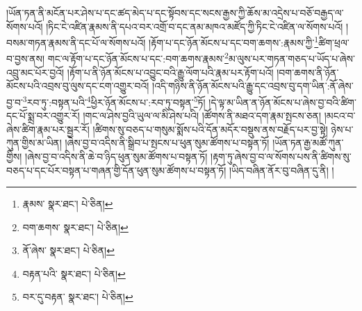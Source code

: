།ཡོན་ཏན་ནི་མངོན་པར་ཤེས་པ་དང་ཚད་མེད་པ་དང་སྟོབས་དང་སངས་རྒྱས་ཀྱི་ཆོས་མ་འདྲེས་པ་བཅོ་བརྒྱད་ལ་སོགས་པའོ། །ཏིང་ངེ་འཛིན་རྣམས་ནི་དཔའ་བར་འགྲོ་བ་དང་ནམ་མཁའ་མཛོད་ཀྱི་ཏིང་ངེ་འཛིན་ལ་སོགས་པའོ། །བསམ་གཏན་རྣམས་ནི་དང་པོ་ལ་སོགས་པའོ། །རྟོག་པ་དང་ཉོན་མོངས་པ་དང་བག་ཆགས་:རྣམས་ཀྱི་\footnote{རྣམས་  སྣར་ཐང་།  པེ་ཅིན། }ཚིག་ཕྲལ་བ་བྱས་ནས། གང་ལ་རྟོག་པ་དང་ཉོན་མོངས་པ་དང་:བག་ཆགས་རྣམས་\footnote{བག་ཆགས་  སྣར་ཐང་།  པེ་ཅིན། }མ་ལུས་པར་གཏན་གཅད་པ་ཡོད་པ་ཞེས་འབྲུ་མང་པོར་བྱའོ། །རྟོག་པ་ནི་ཉོན་མོངས་པ་འབྱུང་བའི་རྒྱུ་ལོག་པའི་རྣམ་པར་རྟོག་པའོ། །བག་ཆགས་ནི་ཉོན་མོངས་པའི་འབྲས་བུ་ལུས་དང་ངག་འགྱུར་བའོ། །འདི་གཉིས་ནི་ཉོན་མོངས་པའི་རྒྱུ་དང་འབྲས་བུ་དག་ཡིན་:ནོ་ཞེས་བྱ་བ་\footnote{ནོ་ཞེས་  སྣར་ཐང་།  པེ་ཅིན། }རབ་ཏུ་:བསྟན་པའི་\footnote{བརྟན་པའི་  སྣར་ཐང་།  པེ་ཅིན། }ཕྱིར་ཉོན་མོངས་པ་:རབ་ཏུ་བསྟན་\footnote{བར་དུ་བརྟན་  སྣར་ཐང་།  པེ་ཅིན། }ཏོ། །དེ་ལྟ་མ་ཡིན་ན་ཉོན་མོངས་པ་ཞེས་བྱ་བའི་ཚིག་དང་པོ་སྨྲ་བར་འགྱུར་རོ། །གང་ལ་ཤེས་བྱའི་ཡུལ་ལ་མི་ཤེས་པའི། །ཚོགས་ནི་མཐའ་དག་རྣམ་སྤངས་ཅན། །མངའ་བ་ཞེས་ཚིག་རྣམ་པར་སྦྱར་རོ། །ཚིགས་སུ་བཅད་པ་གསུམ་སྨོས་པའི་དོན་མདོར་བསྡུས་ནས་བརྗོད་པར་བྱ་སྟེ། ཉེས་པ་ཀུན་གྱིས་མ་ཡིན། །ཞེས་བྱ་བ་འདིས་ནི་སྒྲིབ་པ་སྤངས་པ་ཕུན་སུམ་ཚོགས་པ་བསྟན་ཏོ། །ཡོན་ཏན་རྒྱ་མཚོ་ཀུན་གྱིས། །ཞེས་བྱ་བ་འདིས་ནི་ཆེ་བ་ཉིད་ཕུན་སུམ་ཚོགས་པ་བསྟན་ཏོ། །རྟག་ཏུ་ཞེས་བྱ་བ་ལ་སོགས་པས་ནི་ཚིགས་སུ་བཅད་པ་དང་པོར་བསྟན་པ་གཞན་གྱི་དོན་ཕུན་སུམ་ཚོགས་པ་བསྟན་ཏོ། །ཡིད་བཞིན་ནོར་བུ་བཞིན་དུ་ནི། །

